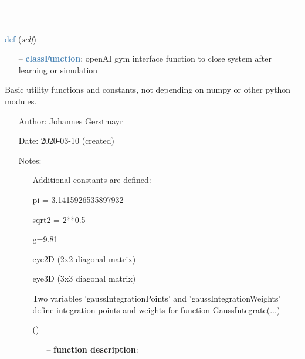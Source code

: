 \begin{itemize}[leftmargin=1.4cm]
%
\noindent\rule{8cm}{0.75pt}\vspace{1pt} \\ 
\begin{flushleft}
\noindent \textcolor{steelblue}{def {\bf {}}}\label{sec:artificialIntelligence:OpenAIGymInterfaceEnv:close}
({\it self})
\end{flushleft}
\setlength{\itemindent}{0.7cm}
\begin{itemize}[leftmargin=0.7cm]
  \item[--]  \textcolor{steelblue}{\bf classFunction}: openAI gym interface function to close system after learning or simulation\vspace{12pt}\end{itemize}
%
\label{sec:module:basicUtilities}
 	Basic utility functions and constants, not depending on numpy or other python modules.
\begin{itemize}[leftmargin=1.4cm]
\setlength{\itemindent}{-1.4cm}
\item[]Author:    Johannes Gerstmayr
\item[]Date:      2020-03-10 (created)
\item[]Notes:
\vspace{-22pt}\begin{itemize}[leftmargin=0.5cm]
\setlength{\itemindent}{-0.5cm}
\item[] 	Additional constants are defined: 
\item[]			pi = 3.1415926535897932 
\item[]			sqrt2 = 2**0.5
\item[]			g=9.81
\item[]			eye2D (2x2 diagonal matrix)
\item[]			eye3D (3x3 diagonal matrix)
\item[] 			Two variables 'gaussIntegrationPoints' and 'gaussIntegrationWeights' define integration points and weights for function GaussIntegrate(...)
\ei
\ei
\begin{flushleft}
\label{sec:basicUtilities:ClearWorkspace}
({\it })
\end{flushleft}
\setlength{\itemindent}{0.7cm}
\begin{itemize}[leftmargin=0.7cm]
  \item[--]  {\bf function description}: \vspace{-6pt}

\end{itemize}
\end{itemize}
\end{itemize}
\end{itemize}
